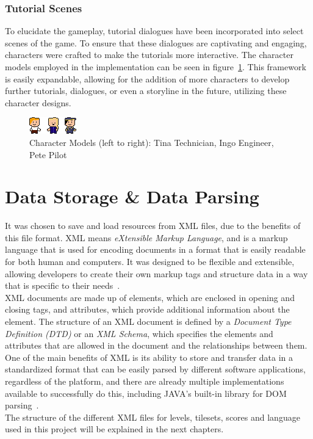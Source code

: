 \subsubsection{Tutorial Scenes}\label{subsubsec:tutorial-scenes}
To elucidate the gameplay, tutorial dialogues have been incorporated into select scenes of the game.
To ensure that these dialogues are captivating and engaging, characters were crafted to make the tutorials more interactive.
The character models employed in the implementation can be seen in figure~\ref{fig:character-models}.
This framework is easily expandable, allowing for the addition of more characters to develop further tutorials,
dialogues, or even a storyline in the future, utilizing these character designs.
\begin{figure}
    \centering
    \includegraphics[width=\textwidth]{Pictures/res/implementation/character-models}
    \caption{Character Models (left to right): Tina Technician, Ingo Engineer, Pete Pilot}
    \label{fig:character-models}
\end{figure}

\section{Data Storage \& Data Parsing}\label{sec:data-storage-&-data-parsing}
It was chosen to save and load resources from XML files, due to the benefits of this file format.
XML means \textit{eXtensible Markup Language}, and is a markup language that is used for encoding documents in a format that is easily readable for both human and computers.
It was designed to be flexible and extensible, allowing developers to create their own markup tags and structure data in a way that is specific to their needs~\cite{xml}.
\\
XML documents are made up of elements, which are enclosed in opening and closing tags, and attributes, which provide additional information about the element.
The structure of an XML document is defined by a \textit{Document Type Definition (DTD)} or an \textit{XML Schema}, which specifies the elements and attributes that are allowed in the document and the relationships between them.
\\
One of the main benefits of XML is its ability to store and transfer data in a standardized format that can be easily parsed by different software applications, regardless of the platform, and there are
already multiple implementations available to successfully do this, including JAVA's built-in library for DOM parsing~\cite{dom-parser}.
\\
The structure of the different XML files for levels, tilesets, scores and language used in this project will be explained in the next chapters.
